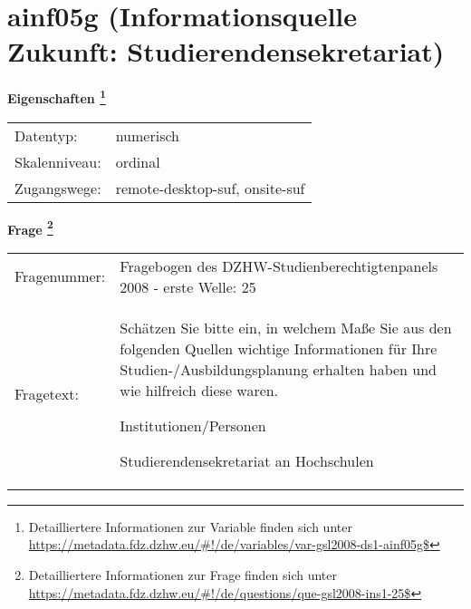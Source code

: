 
    \setcounter{footnote}{0}

    \vspace*{-1.8cm}
	\section{ainf05g (Informationsquelle Zukunft: Studierendensekretariat)}
	\label{section:ainf05g}



    \vspace*{0.5cm}
    \noindent\textbf{Eigenschaften
	\footnote{Detailliertere Informationen zur Variable finden sich unter
		\url{https://metadata.fdz.dzhw.eu/\#!/de/variables/var-gsl2008-ds1-ainf05g$}}}\\
	\begin{tabularx}{\hsize}{@{}lX}
	Datentyp: & numerisch \\
	Skalenniveau: & ordinal \\
	Zugangswege: &
	  remote-desktop-suf, 
	  onsite-suf
 \\
    \end{tabularx}



				\vspace*{0.5cm}
                \noindent\textbf{Frage
	                \footnote{Detailliertere Informationen zur Frage finden sich unter
		              \url{https://metadata.fdz.dzhw.eu/\#!/de/questions/que-gsl2008-ins1-25$}}}\\
				\begin{tabularx}{\hsize}{@{}lX}
					Fragenummer: &
					  Fragebogen des DZHW-Studienberechtigtenpanels 2008 - erste Welle:
					  25
 \\
					Fragetext: & Schätzen Sie bitte ein, in welchem Maße Sie aus den folgenden Quellen wichtige Informationen für Ihre Studien-/Ausbildungsplanung erhalten haben und wie hilfreich diese waren.\par  Institutionen/Personen\par  Studierendensekretariat an Hochschulen \\
				\end{tabularx}






